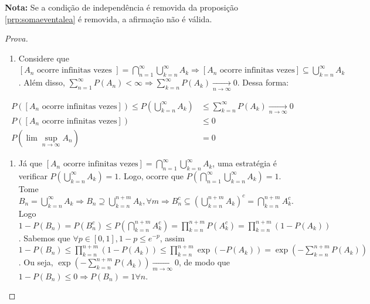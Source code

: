 \documentclass[
]{article}
\providecommand{\tightlist}{%
  \setlength{\itemsep}{0pt}\setlength{\parskip}{0pt}}
\theoremstyle{definition}
\theoremstyle{definition}
\theoremstyle{definition}
\theoremstyle{definition}
\theoremstyle{remark}
\begin{document}
\textbf{Nota:} Se a condição de independência é removida da proposição \ref{prp:somaeventalea} é removida, a afirmação não é válida.

\begin{proof}[Prova]
\leavevmode

\begin{enumerate}
\def\labelenumi{\alph{enumi})}
\tightlist
\item
  Considere que \([A_{n} \text{ ocorre infinitas vezes }] = \bigcap_{n=1}^{\infty}\bigcup_{k=n}^{\infty}A_{k} \Rightarrow [A_{n} \text{ ocorre infinitas vezes}] \subseteq \bigcup_{k=n}^{\infty}A_{k}\). Além disso, \(\sum_{n=1}^{\infty}P(A_{n}) < \infty \Rightarrow \sum_{k=n}^{\infty}P(A_{k}) \xrightarrow[n \to \infty]{}0\). Dessa forma:
\end{enumerate}

\begin{align*}
P([A_{n} \text{ ocorre infinitas vezes}]) \le P\left(\bigcup_{k=n}^{\infty}A_{k}\right) &\le \sum_{k=n}^{\infty}P(A_{k}) \xrightarrow[n \to \infty]{} 0 \\
P([A_{n} \text{ ocorre infinitas vezes}]) &\le 0 \\
P\left(\lim\sup_{n \to \infty}A_{n}\right) &= 0
\end{align*}

\begin{enumerate}
\def\labelenumi{\alph{enumi})}
\setcounter{enumi}{1}
\tightlist
\item
  Já que \([A_{n} \text{ ocorre infinitas vezes}] = \bigcap_{n=1}^{\infty}\bigcup_{k=n}^{\infty}A_{k}\), uma estratégia é verificar \(P\left(\bigcup_{k=n}^{\infty}A_{k}\right) = 1\). Logo, ocorre que \(P\left(\bigcap_{n=1}^{\infty}\bigcup_{k=n}^{\infty}A_{k}\right) = 1\). Tome \(B_{n} = \bigcup_{k=n}^{\infty}A_{k} \Rightarrow B_{n} \supseteq \bigcup_{k=n}^{n+m}A_{k}, \forall m \Rightarrow B_{n}^{c} \subseteq \left(\bigcup_{k=n}^{n+m}A_{k}\right)^{c} = \bigcap_{k=n}^{n+m}A_{k}^{c}\). Logo \(1 - P(B_{n}) = P(B_{n}^{c}) \le P\left(\bigcap_{k=n}^{n+m}A_{k}^{c}\right) = \prod_{k=n}^{n+m}P(A_{k}^{c}) = \prod_{k=n}^{n+m}(1 - P(A_{k}))\). Sabemos que \(\forall p \in [0,1], 1 - p \le e^{-p}\), assim \(1 - P(B_{n}) \le \prod_{k=n}^{n+m}(1 - P(A_{k})) \le \prod_{k=n}^{n+m}\exp(-P(A_{k})) = \exp\left(-\sum_{k=n}^{n+m}P(A_{k})\right)\). Ou seja, \(\exp\left(-\sum_{k=n}^{n+m}P(A_{k})\right) \xrightarrow[m \to \infty]{}0\), de modo que \(1 - P(B_{n}) \le 0 \Rightarrow P(B_{n}) = 1 \forall n\).
\end{enumerate}

\end{proof}
\end{document}
